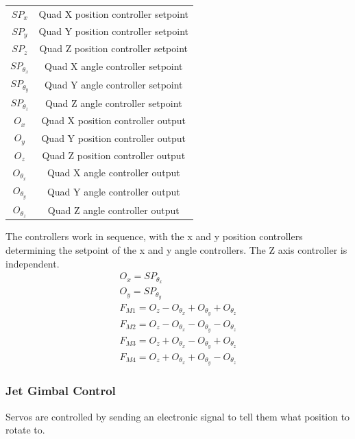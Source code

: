 \documentclass[11pt,twoside]{article}
\begin{document}
\begin{center}
\begin{tabular}{cc}
    $SP_x$ & Quad X position controller setpoint \\
    $SP_y$ & Quad Y position controller setpoint \\
    $SP_z$ & Quad Z position controller setpoint \\
    $SP_{\theta_x}$ & Quad X angle controller setpoint \\
    $SP_{\theta_y}$ & Quad Y angle controller setpoint \\
    $SP_{\theta_z}$ & Quad Z angle controller setpoint \\
    $O_x$ & Quad X position controller output \\
    $O_y$ & Quad Y position controller output \\
    $O_z$ & Quad Z position controller output \\
    $O_{\theta_x}$ & Quad X angle controller output \\
    $O_{\theta_y}$ & Quad Y angle controller output \\
    $O_{\theta_z}$ & Quad Z angle controller output \\
\end{tabular}
\end{center}

The controllers work in sequence, with the x and y position controllers determining the setpoint of the x and y angle controllers. The Z axis controller is independent.
\begin{eqnarray}
     O_x = SP_{\theta_x} \nonumber \\
     O_y = SP_{\theta_y} \nonumber \\
     F_{M1} = O_z - O_{\theta_x} + O_{\theta_y} + O_{\theta_z} \label{eqn:FM1} \\
     F_{M2} = O_z - O_{\theta_x} - O_{\theta_y} - O_{\theta_z} \\
     F_{M3} = O_z + O_{\theta_x} - O_{\theta_y} + O_{\theta_z} \\
     F_{M4} = O_z + O_{\theta_x} + O_{\theta_y} - O_{\theta_z} \label{eqn:FM4}
\end{eqnarray}

\subsubsection{Jet Gimbal Control}
Servos are controlled by sending an electronic signal to tell them what position to rotate to.
\end{document}
